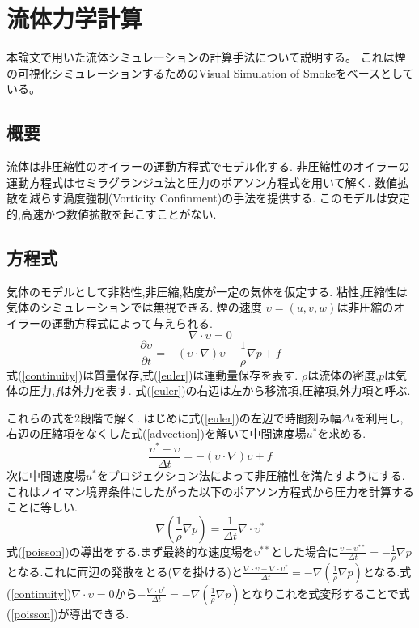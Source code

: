 \appendix
\chapter{流体力学計算}
\label{smoke}
本論文で用いた流体シミュレーションの計算手法について説明する。
これは煙の可視化シミュレーションするためのVisual Simulation of Smoke\cite{Fedkiw2001}をベースとしている。
\section{概要}
流体は非圧縮性のオイラーの運動方程式でモデル化する.
非圧縮性のオイラーの運動方程式はセミラグランジュ法と圧力のポアソン方程式を用いて解く.
数値拡散を減らす渦度強制(Vorticity Confinment)の手法を提供する.
このモデルは安定的,高速かつ数値拡散を起こすことがない.
\section{方程式}
気体のモデルとして非粘性,非圧縮,粘度が一定の気体を仮定する.
粘性,圧縮性は気体のシミュレーションでは無視できる.
煙の速度 $\upsilon = (u,v,w)$は非圧縮のオイラーの運動方程式によって与えられる.
\begin{equation}
\label{continuity}
\nabla \cdot \upsilon = 0
\end{equation}
\begin{equation}
\label{euler}
\frac{\partial \upsilon}{\partial t} = -(\upsilon \cdot \nabla)\upsilon - \frac{1}{\rho}\nabla p + f
\end{equation}
式(\ref{continuity})は質量保存,式(\ref{euler})は運動量保存を表す.
$\rho$は流体の密度,$p$は気体の圧力,$f$は外力を表す.
式(\ref{euler})の右辺は左から移流項,圧縮項,外力項と呼ぶ.

これらの式を2段階で解く.
はじめに式(\ref{euler})の左辺で時間刻み幅$\Delta t$を利用し,
右辺の圧縮項をなくした式(\ref{advection})を解いて中間速度場$u^*$を求める.
\begin{equation}
\label{advection}
\frac{\upsilon^* - \upsilon}{\Delta t} = -(\upsilon \cdot \nabla)\upsilon + f
\end{equation}
次に中間速度場$u^*$をプロジェクション法によって非圧縮性を満たすようにする.
これはノイマン境界条件にしたがった以下のポアソン方程式から圧力を計算することに等しい.
\begin{equation}
\label{poisson}
\nabla \left( \frac{1}{\rho} \nabla p \right) = \frac{1}{\Delta t} \nabla \cdot \upsilon^*
\end{equation}
式(\ref{poisson})の導出をする.まず最終的な速度場を$\upsilon^{**}$とした場合に$\frac{\upsilon - \upsilon^{**} }{\Delta t} = - \frac{1}{\rho} \nabla p$となる.これに両辺の発散をとる($\nabla$を掛ける)と$\frac{\nabla \cdot \upsilon - \nabla \cdot \upsilon^*}{\Delta t} = - \nabla \left( \frac{1}{\rho} \nabla p \right)$となる.式(\ref{continuity})$\nabla \cdot \upsilon = 0$から$- \frac{\nabla \cdot \upsilon^*}{\Delta t} = - \nabla \left( \frac{1}{\rho} \nabla p \right)$となりこれを式変形することで式(\ref{poisson})が導出できる.

